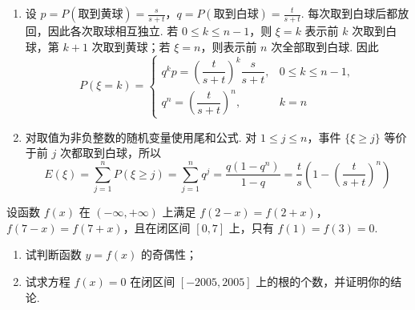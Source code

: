 \begin{solution}
\begin{enumerate}
\item
设
\(p=P(\text{取到黄球})=\frac{s}{s+t}\)，\(q=P(\text{取到白球})=\frac{t}{s+t}\).
每次取到白球后都放回，因此各次取球相互独立. 若 \(0\leqslant k\leqslant n-1\)，则 \(\xi=k\) 表示前 \(k\) 次取到白球，第 \(k+1\) 次取到黄球；若 \(\xi=n\)，则表示前 \(n\) 次全部取到白球. 因此
\[
P(\xi=k)=
\begin{cases}
q^kp=\left(\dfrac{t}{s+t}\right)^k\dfrac{s}{s+t},&0\leqslant k\leqslant n-1,\\
q^n=\left(\dfrac{t}{s+t}\right)^n,&k=n
\end{cases}
\]

\item
对取值为非负整数的随机变量使用尾和公式. 对 \(1\leqslant j\leqslant n\)，事件 \(\{\xi\geqslant j\}\) 等价于前 \(j\) 次都取到白球，所以
\[
E(\xi)=\sum_{j=1}^{n}P(\xi\geqslant j)=\sum_{j=1}^{n}q^j
 =\frac{q(1-q^n)}{1-q}
 =\frac{t}{s}\left(1-\left(\frac{t}{s+t}\right)^n\right)
\]
\end{enumerate}
\end{solution}

\begin{problem}
设函数 \(f(x)\) 在 \((-\infty, +\infty)\) 上满足 \(f(2 - x) = f(2 + x)\)，\(f(7 - x) = f(7 + x)\)，且在闭区间 \([0,7]\) 上，只有 \(f(1) = f(3) = 0\).
\begin{enumerate}
\item 试判断函数 \(y = f(x)\) 的奇偶性；
\item 试求方程 \(f(x) = 0\) 在闭区间 \([-2005, 2005]\) 上的根的个数，并证明你的结论.
\end{enumerate}
\end{problem}

